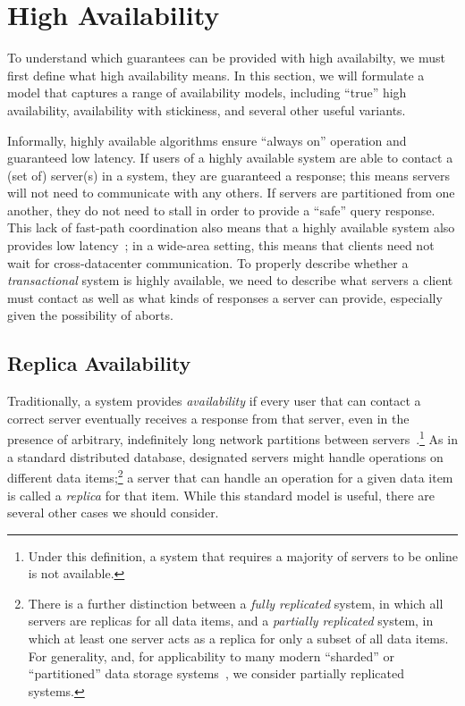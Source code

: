 
\section{High Availability}
\label{sec:availability}

To understand which guarantees can be provided with high availabilty,
we must first define what high availability means. In this section, we
will formulate a model that captures a range of availability models,
including ``true'' high availability, availability with stickiness,
and several other useful variants.

Informally, highly available algorithms ensure ``always on'' operation
and guaranteed low latency. If users of a highly available system are
able to contact a (set of) server(s) in a system, they are guaranteed
a response; this means servers will not need to communicate with any
others. If servers are partitioned from one another, they do not need
to stall in order to provide a ``safe'' query response. This lack of
fast-path coordination also means that a highly available system also
provides low latency~\cite{abadi-pacelc}; in a wide-area setting, this
means that clients need not wait for cross-datacenter
communication. To properly describe whether a \textit{transactional}
system is highly available, we need to describe what servers a client
must contact as well as what kinds of responses a server can provide,
especially given the possibility of aborts.

\subsection{Replica Availability}

Traditionally, a system provides {\em availability} if every user that
can contact a correct server eventually receives a response from that
server, even in the presence of arbitrary, indefinitely long network
partitions between servers~\cite{gilbert-cap}.\footnote{Under this
  definition, a system that requires a majority of servers to be
  online is not available.} As in a standard distributed database,
designated servers might handle operations on different data
items;\footnote{There is a further distinction between a \textit{fully
    replicated} system, in which all servers are replicas for all data
  items, and a \textit{partially replicated} system, in which at least
  one server acts as a replica for only a subset of all data
  items. For generality, and, for applicability to many modern
  ``sharded'' or ``partitioned'' data storage systems~\cite{dynamo,
    pnuts, bigtable, spanner, hstore}, we consider partially
  replicated systems.} a server that can handle an operation for a
given data item is called a \textit{replica} for that item. While this
standard model is useful, there are several other cases we should
consider.

